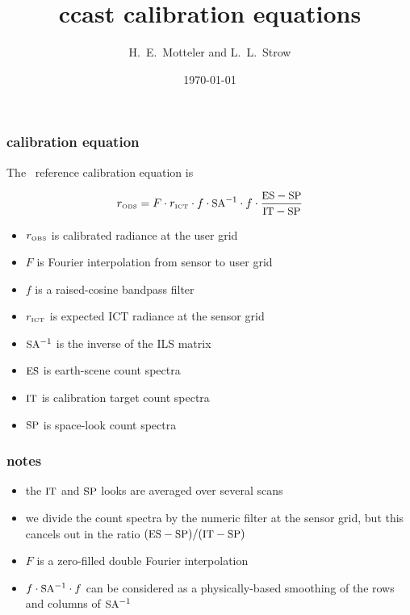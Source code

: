 \documentclass[11pt]{beamer}
\title{ccast calibration equations}
\author{H.~E.~Motteler and L.~L.~Strow}
\institute{
  UMBC Atmospheric Spectroscopy Lab \\
  Joint Center for Earth Systems Technology \\
}
\date{\today}
\begin{document}
\begin{frame}[plain]
\titlepage
\end{frame}
\begin{frame}
\frametitle{calibration equation}

The \ccast\ reference calibration equation is

\[r_{\mbox{\tiny OBS}} = F \cdot r_{\mbox{\tiny ICT}}\cdot f \cdot
  \mbox{\small SA}^{-1}\cdot f \cdot \frac{\mbox{\small ES} - \mbox{\small SP}}{\mbox{\small IT} - \mbox{\small SP}} \]

\begin{itemize}
  \item $r_{\mbox{\tiny OBS}}$ is calibrated radiance at the user grid
  \item $F$ is Fourier interpolation from sensor to user grid
  \item $f$ is a raised-cosine bandpass filter
  \item $r_{\mbox{\tiny ICT}}$ is expected ICT radiance at the sensor grid
  \item $\mbox{\small SA}^{-1}$ is the inverse of the ILS matrix
  \item $\mbox{\small ES}$ is earth-scene count spectra
  \item $\mbox{\small IT}$ is calibration target count spectra
  \item $\mbox{\small SP}$ is space-look count spectra
\end{itemize}

\end{frame}
\begin{frame}
\frametitle{notes}

\begin{itemize}
  \item the $\mbox{\small IT}$ and $\mbox{\small SP}$ looks are averaged over several scans
  \item we divide the count spectra by the numeric filter
    at the sensor grid, but this cancels out in the ratio $(\mbox{\small ES} - \mbox{\small SP}) /
    (\mbox{\small IT} - \mbox{\small SP})$
  \item $F$ is a zero-filled double Fourier interpolation
  \item $f \cdot \mbox{\small SA}^{-1} \cdot f$ can be considered as a
    physically-based smoothing of the rows and columns of $\mbox{\small SA}^{-1}$
\end{itemize}

\end{frame}
\end{document}
